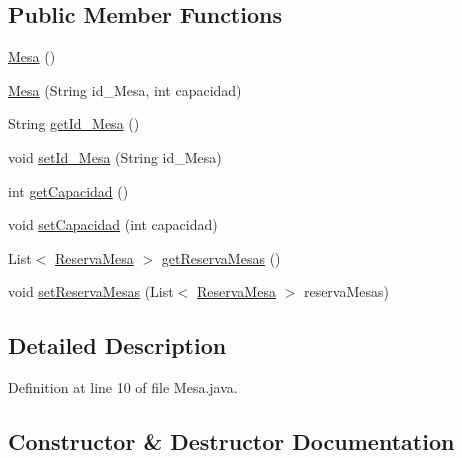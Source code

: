\subsection*{Public Member Functions}
\begin{DoxyCompactItemize}
\item 
\mbox{\hyperlink{classes_1_1deusto_1_1spq_1_1biblioteca_1_1data_1_1_mesa_aa0a592f97fba65ff6876128ef9e165db}{Mesa}} ()
\item 
\mbox{\hyperlink{classes_1_1deusto_1_1spq_1_1biblioteca_1_1data_1_1_mesa_afee980f30faf1021a8524f2710052407}{Mesa}} (String id\+\_\+\+Mesa, int capacidad)
\item 
String \mbox{\hyperlink{classes_1_1deusto_1_1spq_1_1biblioteca_1_1data_1_1_mesa_a9f857960ef6fc3b21394170fbeb509a0}{get\+Id\+\_\+\+Mesa}} ()
\item 
void \mbox{\hyperlink{classes_1_1deusto_1_1spq_1_1biblioteca_1_1data_1_1_mesa_a3f65b40c755b53591c7b24509847901c}{set\+Id\+\_\+\+Mesa}} (String id\+\_\+\+Mesa)
\item 
int \mbox{\hyperlink{classes_1_1deusto_1_1spq_1_1biblioteca_1_1data_1_1_mesa_a7b02c04c7dbfbc6f623dbe35e633184c}{get\+Capacidad}} ()
\item 
void \mbox{\hyperlink{classes_1_1deusto_1_1spq_1_1biblioteca_1_1data_1_1_mesa_a03ca39b1e1c15d5e262d373eeb8f988e}{set\+Capacidad}} (int capacidad)
\item 
List$<$ \mbox{\hyperlink{classes_1_1deusto_1_1spq_1_1biblioteca_1_1data_1_1_reserva_mesa}{Reserva\+Mesa}} $>$ \mbox{\hyperlink{classes_1_1deusto_1_1spq_1_1biblioteca_1_1data_1_1_mesa_a4171a2960ec013a91c55d306e9feef8c}{get\+Reserva\+Mesas}} ()
\item 
void \mbox{\hyperlink{classes_1_1deusto_1_1spq_1_1biblioteca_1_1data_1_1_mesa_af960339335802227aa788285130eb4c7}{set\+Reserva\+Mesas}} (List$<$ \mbox{\hyperlink{classes_1_1deusto_1_1spq_1_1biblioteca_1_1data_1_1_reserva_mesa}{Reserva\+Mesa}} $>$ reserva\+Mesas)
\end{DoxyCompactItemize}


\subsection{Detailed Description}


Definition at line 10 of file Mesa.\+java.



\subsection{Constructor \& Destructor Documentation}
\mbox{\label{classes_1_1deusto_1_1spq_1_1biblioteca_1_1data_1_1_mesa_aa0a592f97fba65ff6876128ef9e165db}} 
